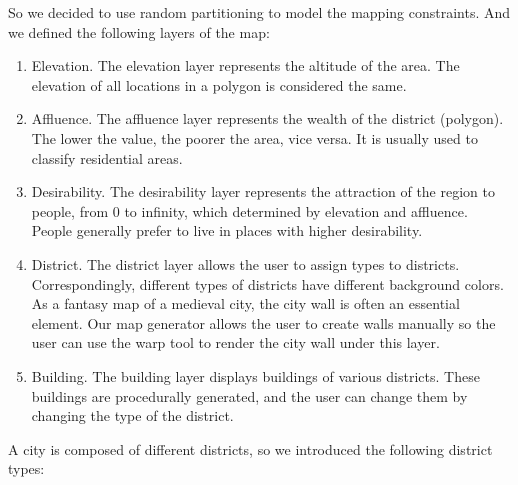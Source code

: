 So we decided to use random partitioning to model the mapping constraints. And we defined the following layers of the map:

\begin{enumerate}
  \item Elevation. The elevation layer represents the altitude of the area. The elevation of all locations in a polygon is considered the same.
  \item Affluence. The affluence layer represents the wealth of the district (polygon). The lower the value, the poorer the area, vice versa. It is usually used to classify residential areas.
  \item Desirability. The desirability layer represents the attraction of the region to people, from 0 to infinity, which determined by elevation and affluence. People generally prefer to live in places with higher desirability.
  \item District. The district layer allows the user to assign types to districts. Correspondingly, different types of districts have different background colors. As a fantasy map of a medieval city, the city wall is often an essential element. Our map generator allows the user to create walls manually so the user can use the warp tool to render the city wall under this layer.
  \item Building. The building layer displays buildings of various districts. These buildings are procedurally generated, and the user can change them by changing the type of the district.
\end{enumerate}

A city is composed of different districts, so we introduced the following district types:

